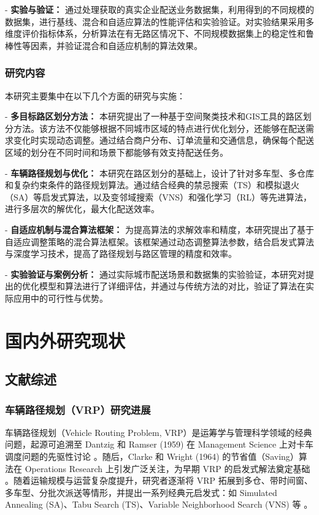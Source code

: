 \documentclass[12pt,a4paper,twoside]{ctexbook}
\let\oldchapter\chapter
\renewcommand{\chapter}{\clearpage\oldchapter}  %
\begin{document}
- \textbf{实验与验证：} 通过处理获取的真实企业配送业务数据集，利用得到的不同规模的数据集，进行基线、混合和自适应算法的性能评估和实验验证。对实验结果采用多维度评价指标体系，分析算法在有无路区情况下、不同规模数据集上的稳定性和鲁棒性等因素，并验证混合和自适应机制的算法效果。

\subsection{研究内容}

本研究主要集中在以下几个方面的研究与实施：

- \textbf{多目标路区划分方法：} 本研究提出了一种基于空间聚类技术和GIS工具的路区划分方法。该方法不仅能够根据不同城市区域的特点进行优化划分，还能够在配送需求变化时实现动态调整。通过结合商户分布、订单流量和交通信息，确保每个配送区域的划分在不同时间和场景下都能够有效支持配送任务。

- \textbf{车辆路径规划与优化：} 本研究在路区划分的基础上，设计了针对多车型、多仓库和复杂约束条件的路径规划算法。通过结合经典的禁忌搜索（TS）和模拟退火（SA）等启发式算法，以及变邻域搜索（VNS）和强化学习（RL）等先进算法，进行多层次的解优化，最大化配送效率。

- \textbf{自适应机制与混合算法框架：} 为提高算法的求解效率和精度，本研究提出了基于自适应调整策略的混合算法框架。该框架通过动态调整算法参数，结合启发式算法与深度学习技术，提高了路径规划与路区管理的精度和效率。

- \textbf{实验验证与案例分析：} 通过实际城市配送场景和数据集的实验验证，本研究对提出的优化模型和算法进行了详细评估，并通过与传统方法的对比，验证了算法在实际应用中的可行性与优势。


\chapter{国内外研究现状}

\section{文献综述}

\subsection{车辆路径规划（VRP）研究进展}
车辆路径规划（Vehicle Routing Problem, VRP）是运筹学与管理科学领域的经典问题，起源可追溯至 Dantzig 和 Ramser (1959) 在 Management Science 上对卡车调度问题的先驱性讨论 \cite{1}。随后，Clarke 和 Wright (1964) 的节省值（Saving）算法在 Operations Research 上引发广泛关注，为早期 VRP 的启发式解法奠定基础 \cite{2}。随着运输规模与运营复杂度提升，研究者逐渐将 VRP 拓展到多仓、带时间窗、多车型、分批次派送等情形，并提出一系列经典元启发式：如 Simulated Annealing (SA)、Tabu Search (TS)、Variable Neighborhood Search (VNS) 等 \cite{3,4,5}。
\end{document}
